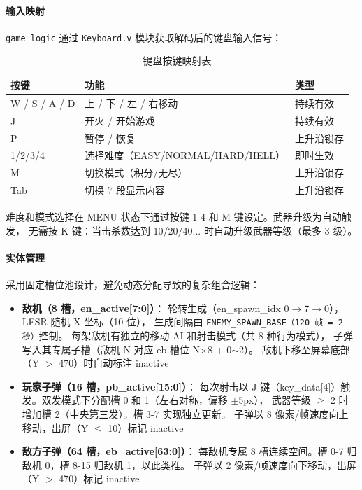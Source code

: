 \documentclass[12pt,a4paper]{ctexart}
\begin{document}
\paragraph{输入映射}

\texttt{game\_logic} 通过 \texttt{Keyboard.v} 模块获取解码后的键盘输入信号：

\begin{table}[H]
\centering
\caption{键盘按键映射表}
\label{tab:input}
\begin{tabular}{lll}
\toprule
\textbf{按键} & \textbf{功能} & \textbf{类型} \\
\midrule
W / S / A / D  & 上 / 下 / 左 / 右移动    & 持续有效 \\
J        & 开火 / 开始游戏   & 持续有效 \\
P        & 暂停 / 恢复        & 上升沿锁存 \\
1/2/3/4  & 选择难度（EASY/NORMAL/HARD/HELL） & 即时生效 \\
M        & 切换模式（积分/无尽）  & 上升沿锁存 \\
Tab      & 切换 7 段显示内容    & 上升沿锁存 \\
\bottomrule
\end{tabular}
\end{table}

难度和模式选择在 MENU 状态下通过按键 1-4 和 M 键设定。武器升级为自动触发，
无需按 K 键：当击杀数达到 10/20/40... 时自动升级武器等级（最多 3 级）。

\paragraph{实体管理}

采用固定槽位池设计，避免动态分配导致的复杂组合逻辑：

\begin{itemize}
    \item \textbf{敌机（8 槽，en\_active[7:0]）}：
    轮转生成（en\_spawn\_idx 0$\rightarrow$7$\rightarrow$0），LFSR 随机 X 坐标（10 位），
    生成间隔由 \texttt{ENEMY\_SPAWN\_BASE（120 帧 = 2 秒）}控制。
    每架敌机有独立的移动 AI 和射击模式（共 8 种行为模式），
    子弹写入其专属子槽（敌机 N 对应 eb 槽位 N×8 + 0$\sim$2）。
    敌机下移至屏幕底部（Y $>$ 470）时自动标注 inactive
    \item \textbf{玩家子弹（16 槽，pb\_active[15:0]）}：
    每次射击以 J 键（key\_data[4]）触发。双发模式下分配槽 0 和 1（左右对称，偏移 $\pm$5px），
    武器等级 $\ge$ 2 时增加槽 2（中央第三发）。槽 3-7 实现独立更新。
    子弹以 8 像素/帧速度向上移动，出屏（Y $\le$ 10）标记 inactive
    \item \textbf{敌方子弹（64 槽，eb\_active[63:0]）}：
    每敌机专属 8 槽连续空间。槽 0-7 归敌机 0，槽 8-15 归敌机 1，以此类推。
    子弹以 2 像素/帧速度向下移动，出屏（Y $>$ 470）标记 inactive
\end{itemize}
\end{document}
